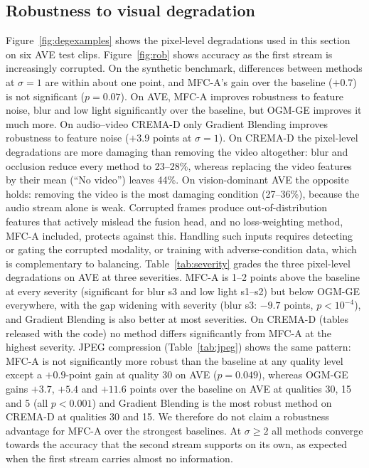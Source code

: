 \documentclass[fleqn,10pt]{wlscirep}
\begin{document}
\subsection*{Robustness to visual degradation}
Figure~\ref{fig:degexamples} shows the pixel-level degradations used in this section on six AVE test clips. Figure~\ref{fig:rob} shows accuracy as the first stream is increasingly corrupted. On the synthetic benchmark, differences between methods at $\sigma{=}1$ are within about one point, and MFC-A's gain over the baseline ($+0.7$) is not significant ($p{=}0.07$). On AVE, MFC-A improves robustness to feature noise, blur and low light significantly over the baseline, but OGM-GE improves it much more. On audio--video CREMA-D only Gradient Blending improves robustness to feature noise ($+3.9$ points at $\sigma{=}1$). On CREMA-D the pixel-level degradations are more damaging than removing the video altogether: blur and occlusion reduce every method to 23--28\%, whereas replacing the video features by their mean (``No video'') leaves 44\%. On vision-dominant AVE the opposite holds: removing the video is the most damaging condition (27--36\%), because the audio stream alone is weak. Corrupted frames produce out-of-distribution features that actively mislead the fusion head, and no loss-weighting method, MFC-A included, protects against this. Handling such inputs requires detecting or gating the corrupted modality, or training with adverse-condition data\cite{lan2025sustechgan}, which is complementary to balancing. Table~\ref{tab:severity} grades the three pixel-level degradations on AVE at three severities. MFC-A is 1--2 points above the baseline at every severity (significant for blur s3 and low light s1--s2) but below OGM-GE everywhere, with the gap widening with severity (blur s3: $-9.7$ points, $p<10^{-4}$), and Gradient Blending is also better at most severities. On CREMA-D (tables released with the code) no method differs significantly from MFC-A at the highest severity. JPEG compression (Table~\ref{tab:jpeg}) shows the same pattern: MFC-A is not significantly more robust than the baseline at any quality level except a $+0.9$-point gain at quality 30 on AVE ($p{=}0.049$), whereas OGM-GE gains $+3.7$, $+5.4$ and $+11.6$ points over the baseline on AVE at qualities 30, 15 and 5 (all $p<0.001$) and Gradient Blending is the most robust method on CREMA-D at qualities 30 and 15. We therefore do not claim a robustness advantage for MFC-A over the strongest baselines. At $\sigma\ge2$ all methods converge towards the accuracy that the second stream supports on its own, as expected when the first stream carries almost no information.
\end{document}
